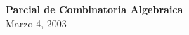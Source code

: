 \documentclass[letterpaper,10pt]{article}
\begin{document}
\begin{center}
{\bf {\Large{Parcial de Combinatoria Algebraica}}}\\
{\large Marzo 4,
2003 }\\[.25in]
\end{center}


\large


\smallskip


\begin{center}
\end{center}

\end{document}
